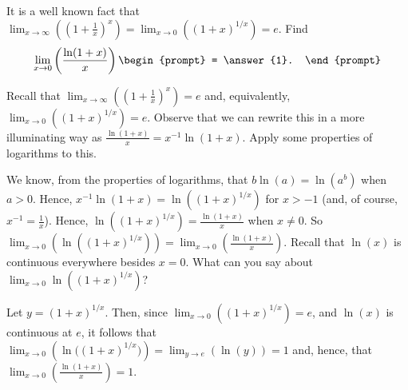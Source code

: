\documentclass{ximera}
\author{Gregory Hartman \and Matthew Carr}
\begin{document}
\begin{exercise}




It is a well known fact that $\lim_{x\to\infty}\left({\left({1+\frac{1}{x}}\right)^{x}}\right)=\lim_{x\to0}\left({(1+x)^{1/x}}\right)=e$.
Find 
\[
\lim_{x\to0}\left({\frac{\ln(1+x)}{x}}\right)
\begin{prompt}
= \answer{1}.
\end{prompt}
\]


\begin{hint}
Recall that $\lim_{x\to\infty}\left({\left({1+\frac{1}{x}}\right)^{x}}\right)=e$ and, equivalently, $\lim_{x\to0}\left({(1+x)^{1/x}}\right)=e$. Observe that we can rewrite this in a more illuminating way as $\frac{\ln(1+x)}{x}=x^{-1}\ln(1+x)$. Apply some properties of logarithms to this.
\end{hint}
\begin{hint}
We know, from the properties of logarithms, that $b\ln(a)=\ln({a^b})$ when $a>0$. Hence, $x^{-1}\ln(1+x)=\ln({(1+x)^{1/x}})$ for $x>-1$ (and, of course, $x^{-1}=\frac{1}{x}$). Hence, $\ln({(1+x)^{1/x}})=\frac{\ln(1+x)}{x}$ when $x\ne0$. So $\lim_{x\to0}\left(\ln({(1+x)^{1/x}})\right)=\lim_{x\to0}\left(\frac{\ln(1+x)}{x}\right)$. Recall that $\ln(x)$ is continuous everywhere besides $x=0$. What can you say about $\lim_{x\to0}\ln({(1+x)^{1/x}})$?
\end{hint}
\begin{hint}
Let $y=(1+x)^{1/x}$. Then, since $\lim_{x\to0}\left({(1+x)^{1/x}}\right)=e$, and $\ln(x)$ is continuous at $e$, it follows that $\lim_{x\to0}\left({\ln({(1+x)^{1/x}}})\right)=\lim_{y\to e}\left({\ln(y)}\right)=1$ and, hence, that $\lim_{x\to0}\left({\frac{\ln(1+x)}{x}}\right)=1$.
\end{hint}
\end{exercise}
\end{document}
